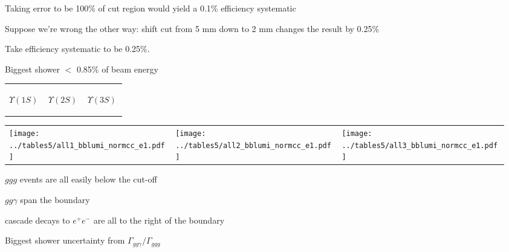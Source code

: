 \documentclass[landscape]{article}
\begin{document}
\vfill

Taking error to be 100\% of cut region would yield a 0.1\% efficiency systematic

\vfill

Suppose we're wrong the other way: shift cut from 5 mm down to 2 mm
changes the result by 0.25\%

\vfill

Take efficiency systematic to be 0.25\%.

\vfill

\pagebreak

Biggest shower $<$ 0.85\% of beam energy

\vspace{-1.75 cm}
\begin{center}
  \begin{tabular}{p{0.32\linewidth} p{0.32\linewidth} p{0.32\linewidth}}
    \begin{center} $\Upsilon(1S)$ \end{center} & \begin{center} $\Upsilon(2S)$ \end{center} & \begin{center} $\Upsilon(3S)$ \end{center} \\
  \end{tabular}

  \vspace{-0.75 cm}
  \begin{tabular}{p{0.32\linewidth} p{0.32\linewidth} p{0.32\linewidth}}
    \texttt{[image: ../tables5/all1\_bblumi\_normcc\_e1.pdf]} &
    \texttt{[image: ../tables5/all2\_bblumi\_normcc\_e1.pdf]} &
    \texttt{[image: ../tables5/all3\_bblumi\_normcc\_e1.pdf]}
  \end{tabular}
\end{center}

\vfill

$ggg$ events are all easily below the cut-off

\vfill

$gg\gamma$ span the boundary

\vfill

cascade decays to $e^+e^-$ are all to the right of the boundary

\vfill

\pagebreak

Biggest shower uncertainty from $\Gamma_{gg\gamma}/\Gamma_{ggg}$
\end{document}
